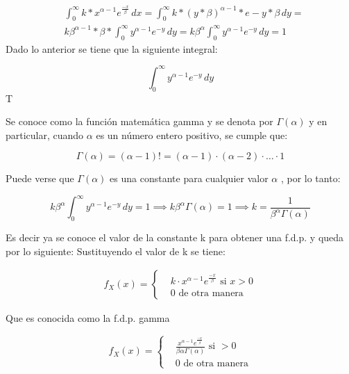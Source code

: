 \begin{align*}
    &\int_0^{\infty} k*x^{\alpha -1}e^{\frac{-x}{\beta}} \, dx =\int_ 0^{\infty} k*( y*\beta )^{\alpha -1}*e- y*\beta  \,dy =\\
    &k\beta^{\alpha -1}*\beta *\int_0^{\infty} y^{\alpha-1}e^{-y}\,dy =k\beta^{\alpha}  \int_0^{\infty} y^{\alpha-1}e^{- y}\, dy =1
\end{align*}
Dado lo anterior se tiene que la siguiente integral:

\begin{equation}
    \int_0^{\infty} y^{\alpha-1}e^{-y}\, dy
\end{equation}T

Se conoce como la función matemática gamma y se
denota por $\Gamma (\alpha )$ y en particular, cuando $\alpha$  es un número
entero positivo, se cumple que:

\begin{equation}
    \Gamma (\alpha )=(\alpha -1)! =(\alpha -1)\cdot (\alpha -2)\cdot \dots \cdot 1
\end{equation}

Puede verse que $\Gamma (\alpha )$ es una constante para cualquier
valor $\alpha$ , por lo tanto:

\begin{equation*}
    k \beta^{\alpha}\int_0^{\infty} y^{\alpha-1}e^{-y}\, dy =1 \implies  k\beta^{\alpha}\Gamma (\alpha )=1 \implies k=\frac{1}{\beta^{\alpha} \Gamma (\alpha )}
\end{equation*}

Es decir ya se conoce el valor de la constante k para
obtener una f.d.p. y queda por lo siguiente:
Sustituyendo el valor de k se tiene:

\begin{align*}
    f_X( x )=\begin{cases}  & k\cdot x^{\alpha-1}e^{\frac{-x}{\beta}}\text{ si } x>0 \\
               & 0 \text{ de otra manera}\end{cases}
\end{align*}

Que es conocida como la f.d.p. gamma

\begin{equation*}
    f_X( x )=\begin{cases}
         & \frac{x^{\alpha-1}e^{\frac{-x}{\beta}}}{\beta \alpha \Gamma (\alpha )}\text{ si }>0 \\
         & 0 \text{ de otra manera}
    \end{cases}
\end{equation*}

